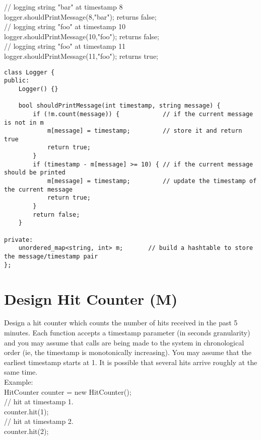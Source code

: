 // logging string "bar" at timestamp 8\\
logger.shouldPrintMessage(8,"bar"); returns false;\\

// logging string "foo" at timestamp 10\\
logger.shouldPrintMessage(10,"foo"); returns false;\\

// logging string "foo" at timestamp 11\\
logger.shouldPrintMessage(11,"foo"); returns true;\\

\begin{lstlisting}
class Logger {
public:
    Logger() {}
    
    bool shouldPrintMessage(int timestamp, string message) {
        if (!m.count(message)) {            // if the current message is not in m
            m[message] = timestamp;         // store it and return true
            return true;
        } 
        if (timestamp - m[message] >= 10) { // if the current message should be printed
            m[message] = timestamp;         // update the timestamp of the current message
            return true;
        }
        return false;
    }

private:
    unordered_map<string, int> m;       // build a hashtable to store the message/timestamp pair
};
\end{lstlisting}


\section{Design Hit Counter (M)}
Design a hit counter which counts the number of hits received in the past 5 minutes. Each function accepts a timestamp parameter (in seconds granularity) and you may assume that calls are being made to the system in chronological order (ie, the timestamp is monotonically increasing). You may assume that the earliest timestamp starts at 1. It is possible that several hits arrive roughly at the same time.\\

Example:\\
HitCounter counter = new HitCounter();\\

// hit at timestamp 1.\\
counter.hit(1);\\

// hit at timestamp 2.\\
counter.hit(2);\\

